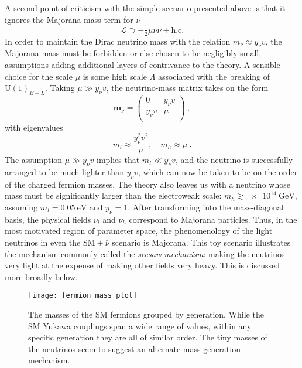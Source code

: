 A second point of criticism with the simple scenario presented above is that it
ignores the Majorana mass term for $\bar{\nu}$
\begin{equation}
  \label{eq:3}
  \mathscr{L} \supset - \tfrac{1}{2} \mu \bar{\nu} \bar{\nu} + \text{h.c.}
\end{equation}
In order to maintain the Dirac neutrino mass with the relation
$m_{\nu} \approx y_{\nu}v$, the Majorana mass must be forbidden or else chosen
to be negligibly small, assumptions adding additional layers of contrivance to
the theory. A sensible choice for the scale $\mu$ is some high scale $\Lambda$
associated with the breaking of $\mathrm{U}(1)_{B-L}$. Taking
$\mu \gg y_{\nu} v$, the neutrino-mass matrix takes on the form
\begin{equation}
  \mathbf{m}_{\nu} = \begin{pmatrix}
    0 & y_{\nu} v \\
    y_{\nu} v & \mu \\
  \end{pmatrix} \ ,
\end{equation}
with eigenvalues
\begin{equation}
  m_{l} \approx \frac{y_{\nu}^{2}v^{2}}{\mu},\quad m_{h} \approx \mu \ .
\end{equation}
The assumption $\mu \gg y_{\nu} v$ implies that $m_{l} \ll y_{\nu} v$, and the
neutrino is successfully arranged to be much lighter than $y_{\nu} v$, which can
now be taken to be on the order of the charged fermion masses. The theory also
leaves us with a neutrino whose mass must be significantly larger than the
electroweak scale: $m_{h} \gtrsim \SI{e14}{\GeV}$, assuming
$m_{l} = \SI{0.05}{\eV}$ and $y_{\nu} = 1$. After transforming into the
mass-diagonal basis, the physical fields $\nu_{l}$ and $\nu_{h}$ correspond to
Majorana particles. Thus, in the most motivated region of parameter space, the
phenomenology of the light neutrinos in even the $\text{SM} + \bar{\nu}$
scenario is Majorana. This toy scenario illustrates the mechanism commonly
called the \textit{seesaw mechanism}: making the neutrinos very light at the
expense of making other fields very heavy. This is discussed more broadly below.

\begin{figure}[t]
  \centering
  \texttt{[image: fermion\_mass\_plot]}
  \caption{The masses of the SM fermions grouped by generation. While the SM
    Yukawa couplings span a wide range of values, within any specific generation
    they are all of similar order. The tiny masses of the neutrinos seem to
    suggest an alternate mass-generation mechanism.}
  \label{fig:fermion-masses}
\end{figure}

